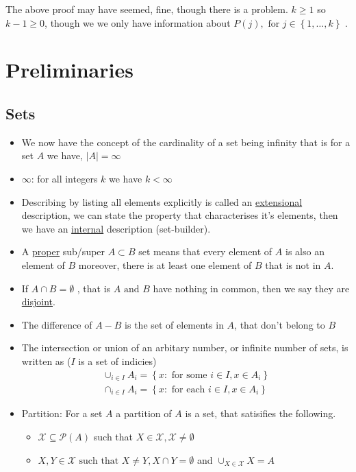\documentclass[11pt]{book}
\begin{document}
The above proof may have seemed, fine, though there is a problem. $k \ge 1$ so $k - 1 \ge 0$, though we we only have information about $P\left(j\right) , \text{ for } j \in \left\{ 1, \ldots , k \right\} $ . 




\chapter{Preliminaries}%
\label{chp:preliminaries}

\section{Sets}%
\label{sec:sets}

\begin{itemize}
    \item We now have the concept of the cardinality of a set being infinity that is for a set $A$ we have, $\left| A \right| = \infty $
    \item $\infty $: for all integers $k$ we have $k < \infty $ 
    \item Describing by listing all elements explicitly is called an \underline{extensional}  description, we can state the property that characterises it's elements, then we have an \underline{internal} description (set-builder).
    \item A \underline{proper}  sub/super $A \subset B$ set means that every element of $A$ is also an element of $B$ moreover, there is at least one element of $B$ that is not in $A$.   
    \item If $A \cap  B = \emptyset  $ , that is $A \text{ and } B$ have nothing in common, then we say they are \underline{disjoint}.
    \item The difference of $A - B$ is the set of elements in $A$, that don't belong to $B$ 
    \item The intersection or union of an arbitary number, or infinite number of sets, is written as ($I$ is a set of indicies)
        \begin{gather*}
            \cup _{i \in I} A_{i} = \left\{ x: \text{ for some } i\in I, x \in A_{i}  \right\} \\
            \cap  _{i \in I} A_{i} = \left\{ x: \text{ for each } i\in I, x \in A_{i}  \right\} 
        \end{gather*}
    \item Partition: For a set $A$ a partition of $A$ is a set, that satisifies the following.
        \begin{itemize}
            \item $\mathcal{X} \subseteq \mathcal{P}(A) $ such that $X \in \mathcal{X}, \mathcal{X} \neq \emptyset $ 
        \item $X,Y \in \mathcal{X} \text{ such that } X\neq Y, X\cap Y= \emptyset $ and $\cup _{X\in \mathcal{X} } X= A$ 
        \end{itemize}
\end{itemize}
\end{document}
